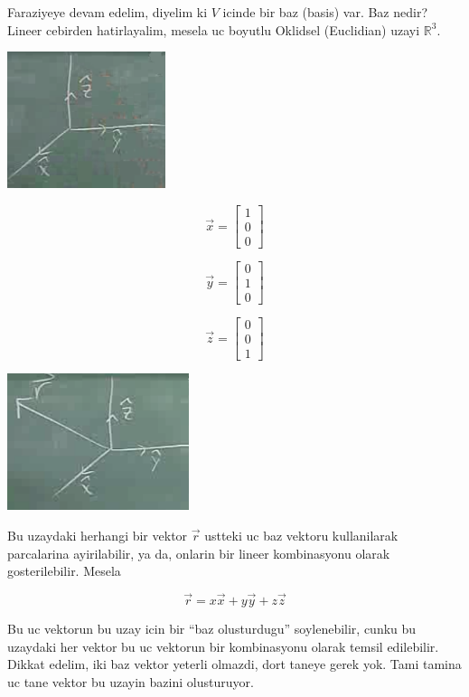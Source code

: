 \documentclass[12pt,fleqn]{article}\usepackage{../common}
\begin{document}
Faraziyeye devam edelim, diyelim ki $V$ icinde bir baz (basis) var. Baz
nedir? Lineer cebirden hatirlayalim, mesela uc boyutlu Oklidsel (Euclidian)
uzayi $\mathbb{R}^3$. 

\includegraphics[height=4cm]{1_6.png}


\[ 
\vec{x} = 
\left[\begin{array}{r}
1 \\ 0 \\ 0
\end{array}\right]
 \]

\[ 
\vec{y} = 
\left[\begin{array}{r}
0 \\ 1 \\ 0
\end{array}\right]
 \]

\[ 
\vec{z} = 
\left[\begin{array}{r}
0 \\ 0 \\ 1
\end{array}\right]
 \]

\includegraphics[height=4cm]{1_7.png}

Bu uzaydaki herhangi bir vektor $\vec{r}$ ustteki uc baz vektoru
kullanilarak parcalarina ayirilabilir, ya da, onlarin bir lineer
kombinasyonu olarak gosterilebilir. Mesela

\[ \vec{r} = x\vec{x} +  y\vec{y} +  z\vec{z} \]

Bu uc vektorun bu uzay icin bir ``baz olusturdugu'' soylenebilir, cunku bu
uzaydaki her vektor bu uc vektorun bir kombinasyonu olarak temsil
edilebilir. Dikkat edelim, iki baz vektor yeterli olmazdi, dort taneye
gerek yok. Tami tamina uc tane vektor bu uzayin bazini olusturuyor. 
\end{document}

